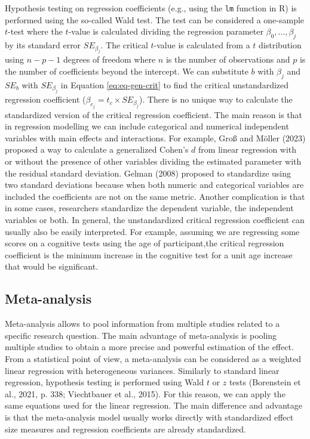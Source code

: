 \documentclass[
  man,floatsintext]{apa7}
\begin{document}
Hypothesis testing on regression coefficients (e.g., using the \texttt{lm} function in R) is performed using the so-called Wald test. The test can be considered a one-sample \(t\)-test where the \(t\)-value is calculated dividing the regression parameter \(\beta_0, \dots, \beta_j\) by its standard error \(SE_{\beta_j}\). The critical \(t\)-value is calculated from a \(t\) distribution using \(n - p - 1\) degrees of freedom where \(n\) is the number of observations and \(p\) is the number of coefficients beyond the intercept. We can substitute \(b\) with \(\beta_j\) and \(SE_{b}\) with \(SE_{\beta_j}\) in Equation \eqref{eq:eq-gen-crit} to find the critical unstandardized regression coefficient (\(\beta_{c_j} = t_c \times SE_{\beta_j}\)). There is no unique way to calculate the standardized version of the critical regression coefficient. The main reason is that in regression modelling we can include categorical and numerical independent variables with main effects and interactions. For example, Groß and Möller (2023) proposed a way to calculate a generalized Cohen's \(d\) from linear regression with or without the presence of other variables dividing the estimated parameter with the residual standard deviation. Gelman (2008) proposed to standardize using two standard deviations because when both numeric and categorical variables are included the coefficients are not on the same metric. Another complication is that in some cases, researchers standardize the dependent variable, the independent variables or both. In general, the unstandardized critical regression coefficient can usually also be easily interpreted. For example, assuming we are regressing some scores on a cognitive tests using the age of participant,the critical regression coefficient is the minimum increase in the cognitive test for a unit age increase that would be significant.

\hypertarget{meta-analysis}{%
\subsection{Meta-analysis}\label{meta-analysis}}

Meta-analysis allows to pool information from multiple studies related to a specific research question. The main advantage of meta-analysis is pooling multiple studies to obtain a more precise and powerful estimation of the effect. From a statistical point of view, a meta-analysis can be considered as a weighted linear regression with heterogeneous variances. Similarly to standard linear regression, hypothesis testing is performed using Wald \(t\) or \(z\) tests (Borenstein et al., 2021, p. 338; Viechtbauer et al., 2015). For this reason, we can apply the same equations used for the linear regression. The main difference and advantage is that the meta-analysis model usually works directly with standardized effect size measures and regression coefficients are already standardized.
\end{document}
